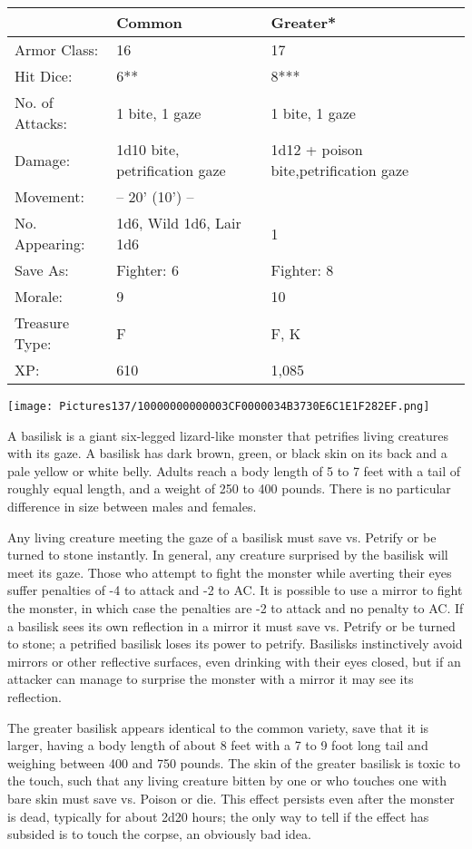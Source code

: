 \documentclass[a4paper,twoside,openany,10pt]{book}
\begin{document}
\begin{multicols}{2}
\begin{tabularx}{0.48\textwidth}{lXX}
& Common & Greater* \\\hline
Armor Class: & 16 & 17 \\\hline
Hit Dice: & 6** & 8*** \\\hline
No. of Attacks: & 1 bite, 1 gaze & 1 bite, 1 gaze \\\hline
Damage: & 1d10 bite, petrification gaze & 1d12 + poison bite,petrification gaze \\\hline
Movement: & -- 20' (10') -- & \\\hline
No. Appearing: & 1d6, Wild 1d6, Lair 1d6 & 1 \\\hline
Save As: & Fighter: 6 & Fighter: 8 \\\hline
Morale: & 9 & 10 \\\hline
Treasure Type: & F & F, K \\\hline
XP: & 610 & 1,085 \\\hline
\end{tabularx}\medskip


\begin{center}
	\texttt{[image: Pictures137/10000000000003CF0000034B3730E6C1E1F282EF.png]}
\end{center}

A basilisk is a giant six-legged lizard-like monster that petrifies living creatures with its gaze. A basilisk has dark brown, green, or black skin on its back and a pale yellow or white belly. Adults reach a body length of 5 to 7 feet with a tail of roughly equal length, and a weight of 250 to 400 pounds. There is no particular difference in size between males and females.

Any living creature meeting the gaze of a basilisk must save vs. Petrify or be turned to stone instantly. In general, any creature surprised by the basilisk will meet its gaze. Those who attempt to fight the monster while averting their eyes suffer penalties of -4 to attack and -2 to AC. It is possible to use a mirror to fight the monster, in which case the penalties are -2 to attack and no penalty to AC. If a basilisk sees its own reflection in a mirror it must save vs. Petrify or be turned to stone; a petrified basilisk loses its power to petrify. Basilisks instinctively avoid mirrors or other reflective surfaces, even drinking with their eyes closed, but if an attacker can manage to surprise the monster with a mirror it may see its reflection.

The greater basilisk appears identical to the common variety, save that it is larger, having a body length of about 8 feet with a 7 to 9 foot long tail and weighing between 400 and 750 pounds. The skin of the greater basilisk is toxic to the touch, such that any living creature bitten by one or who touches one with bare skin must save vs. Poison or die. This effect persists even after the monster is dead, typically for about 2d20 hours; the only way to tell if the effect has subsided is to touch the corpse, an obviously bad idea.


\end{multicols}
\end{document}
